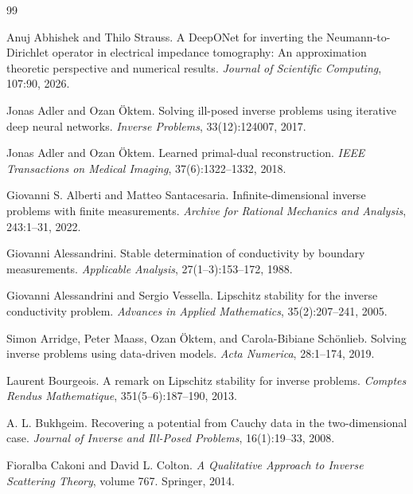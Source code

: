\documentclass{article}
\numberwithin{equation}{section}
\theoremstyle{plain}
\begin{document}
	
	
	\begin{thebibliography}{99}
		
		 Anuj Abhishek and Thilo Strauss.
		A DeepONet for inverting the Neumann-to-Dirichlet operator in electrical impedance tomography: An approximation theoretic
		perspective and numerical results.
		\textit{Journal of Scientific Computing}, 107:90, 2026.
		
		 Jonas Adler and Ozan \"Oktem. Solving ill-posed inverse problems using iterative deep neural networks. \textit{Inverse Problems}, 33(12):124007, 2017.
		
		 Jonas Adler and Ozan \"Oktem. Learned primal-dual reconstruction. \textit{IEEE Transactions on Medical Imaging}, 37(6):1322--1332, 2018.
		
		 Giovanni S. Alberti and Matteo Santacesaria. Infinite-dimensional inverse problems with finite measurements. \textit{Archive for Rational Mechanics and Analysis}, 243:1--31, 2022.
		
		 Giovanni Alessandrini. Stable determination of conductivity by boundary measurements. \textit{Applicable Analysis}, 27(1--3):153--172, 1988.
		
		 Giovanni Alessandrini and Sergio Vessella. Lipschitz stability for the inverse conductivity problem. \textit{Advances in Applied Mathematics}, 35(2):207--241, 2005.
		
		 Simon Arridge, Peter Maass, Ozan \"Oktem, and Carola-Bibiane Sch\"onlieb. Solving inverse problems using data-driven models. \textit{Acta Numerica}, 28:1--174, 2019.
		
		 Laurent Bourgeois. A remark on Lipschitz stability for inverse problems. \textit{Comptes Rendus Mathematique}, 351(5--6):187--190, 2013.
		
		 A. L. Bukhgeim. Recovering a potential from Cauchy data in the two-dimensional case. \textit{Journal of Inverse and Ill-Posed Problems}, 16(1):19--33, 2008.
		
		 Fioralba Cakoni and David L. Colton. \textit{A Qualitative Approach to Inverse Scattering Theory}, volume 767. Springer, 2014.
		

\end{thebibliography}
\end{document}

